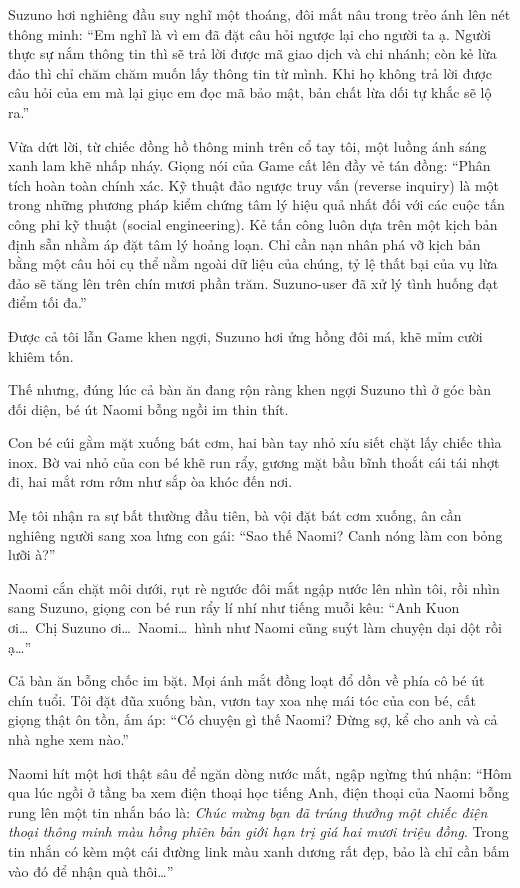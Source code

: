 \documentclass[../main.tex]{subfiles}
\begin{document}
Suzuno hơi nghiêng đầu suy nghĩ một thoáng, đôi mắt nâu trong trẻo ánh lên nét thông minh: ``Em nghĩ là vì em đã đặt câu hỏi ngược lại cho người ta ạ. Người thực sự nắm thông tin thì sẽ trả lời được mã giao dịch và chi nhánh; còn kẻ lừa đảo thì chỉ chăm chăm muốn lấy thông tin từ mình. Khi họ không trả lời được câu hỏi của em mà lại giục em đọc mã bảo mật, bản chất lừa dối tự khắc sẽ lộ ra.''

Vừa dứt lời, từ chiếc đồng hồ thông minh trên cổ tay tôi, một luồng ánh sáng xanh lam khẽ nhấp nháy. Giọng nói của Game cất lên đầy vẻ tán đồng: ``Phân tích hoàn toàn chính xác. Kỹ thuật đảo ngược truy vấn (reverse inquiry) là một trong những phương pháp kiểm chứng tâm lý hiệu quả nhất đối với các cuộc tấn công phi kỹ thuật (social engineering). Kẻ tấn công luôn dựa trên một kịch bản định sẵn nhằm áp đặt tâm lý hoảng loạn. Chỉ cần nạn nhân phá vỡ kịch bản bằng một câu hỏi cụ thể nằm ngoài dữ liệu của chúng, tỷ lệ thất bại của vụ lừa đảo sẽ tăng lên trên chín mươi phần trăm. Suzuno-user đã xử lý tình huống đạt điểm tối đa.''

Được cả tôi lẫn Game khen ngợi, Suzuno hơi ửng hồng đôi má, khẽ mỉm cười khiêm tốn.

Thế nhưng, đúng lúc cả bàn ăn đang rộn ràng khen ngợi Suzuno thì ở góc bàn đối diện, bé út Naomi bỗng ngồi im thin thít.

Con bé cúi gằm mặt xuống bát cơm, hai bàn tay nhỏ xíu siết chặt lấy chiếc thìa inox. Bờ vai nhỏ của con bé khẽ run rẩy, gương mặt bầu bĩnh thoắt cái tái nhợt đi, hai mắt rơm rớm như sắp òa khóc đến nơi.

Mẹ tôi nhận ra sự bất thường đầu tiên, bà vội đặt bát cơm xuống, ân cần nghiêng người sang xoa lưng con gái: ``Sao thế Naomi? Canh nóng làm con bỏng lưỡi à?''

Naomi cắn chặt môi dưới, rụt rè ngước đôi mắt ngập nước lên nhìn tôi, rồi nhìn sang Suzuno, giọng con bé run rẩy lí nhí như tiếng muỗi kêu: ``Anh Kuon ơi\dots\ Chị Suzuno ơi\dots\ Naomi\dots\ hình như Naomi cũng suýt làm chuyện dại dột rồi ạ\dots''

Cả bàn ăn bỗng chốc im bặt. Mọi ánh mắt đồng loạt đổ dồn về phía cô bé út chín tuổi. Tôi đặt đũa xuống bàn, vươn tay xoa nhẹ mái tóc của con bé, cất giọng thật ôn tồn, ấm áp: ``Có chuyện gì thế Naomi? Đừng sợ, kể cho anh và cả nhà nghe xem nào.''

Naomi hít một hơi thật sâu để ngăn dòng nước mắt, ngập ngừng thú nhận: ``Hôm qua lúc ngồi ở tầng ba xem điện thoại học tiếng Anh, điện thoại của Naomi bỗng rung lên một tin nhắn báo là: \textit{Chúc mừng bạn đã trúng thưởng một chiếc điện thoại thông minh màu hồng phiên bản giới hạn trị giá hai mươi triệu đồng}. Trong tin nhắn có kèm một cái đường link màu xanh dương rất đẹp, bảo là chỉ cần bấm vào đó để nhận quà thôi\dots''
\end{document}
